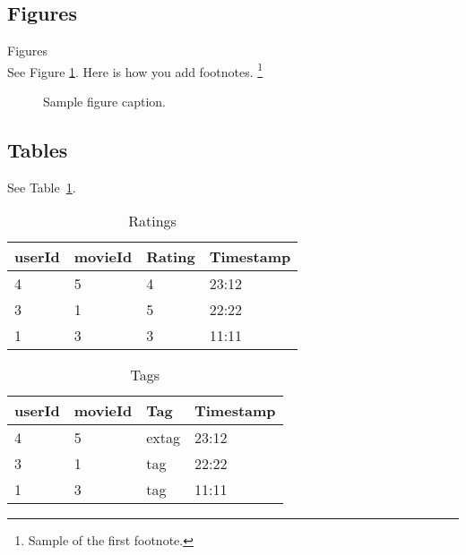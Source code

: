 \documentclass{article}
\begin{document}
\subsection{Figures}
Figures \\
See Figure \ref{fig:fig1}. Here is how you add footnotes. \footnote{Sample of the first footnote.}


\begin{figure}
  \centering
  \fbox{\rule[-.5cm]{4cm}{4cm} \rule[-.5cm]{4cm}{0cm}}
  \caption{Sample figure caption.}
  \label{fig:fig1}
\end{figure}

\subsection{Tables}

See Table~\ref{tab:table1}.

\begin{table}
 \caption{Ratings}
  \centering
  \begin{tabular}{llll}
    \toprule
    userId     & movieId     & Rating & Timestamp \\
    \midrule
    4 & 5  & 4  & 23:12   \\
    3     & 1 & 5     & 22:22 \\
    1     & 3       & 3  & 11:11\\
    \bottomrule
  \end{tabular}
  \label{tab:table1}
\end{table}

\begin{table}
 \caption{Tags}
  \centering
  \begin{tabular}{llll}
    \toprule
    userId     & movieId     & Tag & Timestamp \\
    \midrule
    4 & 5  & extag  & 23:12   \\
    3     & 1 & tag     & 22:22 \\
    1     & 3       & tag  & 11:11\\
    \bottomrule
  \end{tabular}
  \label{tab:table2}
\end{table}




  
\end{document}
